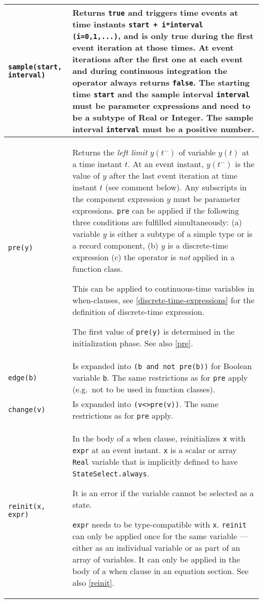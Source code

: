 \begin{longtable}{|p{5cm}|p{8cm}|}
\lstinline!sample(start, interval)! & Returns \lstinline!true! and triggers time events at time
instants \lstinline!start + i*interval (i=0,1,...)!, and is only true during the first event iteration at those times.
At event iterations after the first one at each event and during continuous integration
the operator always returns \lstinline!false!. The starting time \lstinline!start! and the
sample interval \lstinline!interval! must be parameter expressions and need to be
a subtype of Real or Integer. The sample interval \lstinline!interval! must be a
positive number.\\ \hline

\lstinline!pre(y)! & Returns the \emph{left limit} $y(t^{-})$ of
variable $y(t)$ at a time instant $t$.  At an event instant,
$y(t^{-})$ is the value of $y$ after the last event
iteration at time instant $t$ (see comment below).
Any subscripts in the component expression $y$ must be parameter expressions.
\lstinline!pre! can be applied if the following three conditions are fulfilled
simultaneously: (a) variable $y$ is either a subtype of a simple type or
is a record component, (b) $y$ is a discrete-time expression (c) the
operator is \emph{not} applied in a function class.
\begin{nonnormative}
This can be applied to continuous-time variables in when-clauses, see \cref{discrete-time-expressions} for the definition of discrete-time expression.
\end{nonnormative}
The first value of \lstinline!pre(y)! is determined in the initialization phase. See
also \cref{pre}.\\ \hline

\lstinline!edge(b)! & Is expanded into \lstinline!(b and not pre(b))! for Boolean variable
\lstinline!b!. The same restrictions as for \lstinline!pre! apply (e.g.\ not to be
used in function classes).\\ \hline

\lstinline!change(v)! & Is expanded into \lstinline!(v<>pre(v))!. The same restrictions as for \lstinline!pre! apply.\\ \hline

\lstinline!reinit(x, expr)! & In the body of a when clause, reinitializes \lstinline!x! with
\lstinline!expr! at an event instant. \lstinline!x! is a scalar or array \lstinline!Real! variable that is implicitly defined to have \lstinline!StateSelect.always!.
\begin{nonnormative}
It is an error if the variable cannot be selected as a state.
\end{nonnormative}
\lstinline!expr! needs to be type-compatible with \lstinline!x!.
\lstinline!reinit! can only be applied once for the same variable --- either
as an individual variable or as part of an array of variables. It can
only be applied in the body of a when clause in an equation section. See
also \cref{reinit}.\\ \hline
\end{longtable}

